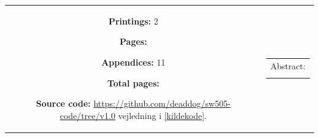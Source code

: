 \begin{titlepage}
\begin{nopagebreak}
{\begin{tabular}{cc}
{{\begin{description}
  	\end{description}
	}
	\begin{description}
		\item { \textbf{Printings:} 2}
		\item { \textbf{Pages:} \pageref{LastPageBody} } 
		\item { \textbf{Appendices:} 11}
		\item { \textbf{Total pages:} \pageref{LastPage} }
		\item { \textbf{Source code:} \url{https://github.com/deaddog/sw505-code/tree/v1.0} vejledning i \cref{kildekode}.}
	\end{description}
	\vfill } &
	\parbox{6.5cm}{
 	 \vspace{.15cm}
  	\hfill 
  	\begin{tabular}{l}
  		{Abstract:}\bigskip \\
  		\fbox{
  		\parbox{6cm}{\bigskip
     		{\vfill{\small 
     		\bigskip}}
     	}}
   	\end{tabular}}
\end{tabular}
}%
\end{nopagebreak}
\end{titlepage}